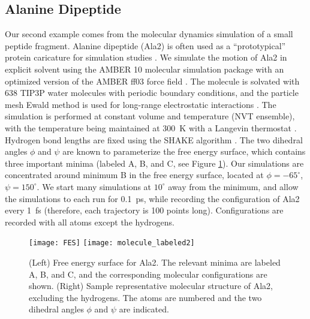 \documentclass[aip,jcp,preprint]{revtex4-1}
\begin{document}
\subsection{Alanine Dipeptide}

Our second example comes from the molecular dynamics simulation of a small peptide fragment.
%
Alanine dipeptide (Ala2) is often used as a ``prototypical'' protein caricature for simulation studies
\cite{apostolakis1999calculation, bolhuis2000reaction, chekmarev2004long, ma2005automatic, frewen2009exploration, ferguson2011integrating}.
%
We simulate the motion of Ala2 in explicit solvent using the AMBER 10 molecular simulation package \cite{case2008Amber} with an
optimized version \cite{best2009optimized} of the AMBER ff03 force field \cite{duan2003point}.
%
The molecule is solvated with 638 TIP3P water molecules \cite{jorgensen1983comparison}
with periodic boundary conditions, and the particle mesh Ewald method is used for long-range electrostatic interactions \cite{essmann1995smooth}.
%
The simulation is performed at constant volume and temperature (NVT ensemble), with the temperature being maintained at 300~K with a Langevin thermostat \cite{loncharich1992langevin}.
%
Hydrogen bond lengths are fixed using the SHAKE algorithm \cite{ryckaert1977numerical}.
%
The two dihedral angles $\phi$ and $\psi$ are known to parameterize the free energy surface, which contains three important minima (labeled A, B, and C, see Figure \ref{fig:ala_fes}).
%
Our simulations are concentrated around minimum B in the free energy surface, located at $\phi=-65^{\circ}$, $\psi=150^{\circ}$.
%
We start many simulations at $10^{\circ}$ away from the minimum, and allow the simulations to each run for 0.1~ps, while recording the configuration of Ala2 every 1~fs (therefore, each trajectory is 100 points long).
%
Configurations are recorded with all atoms except the hydrogens.

\begin{figure}[ht]
    \texttt{[image: FES]}
    \texttt{[image: molecule\_labeled2]}
    \caption{(Left) Free energy surface for Ala2. The relevant minima are labeled A, B, and C, and the corresponding molecular configurations are shown.
    (Right) Sample representative molecular structure of Ala2, excluding the hydrogens. The atoms are numbered and the two dihedral angles $\phi$ and $\psi$ are indicated.}
    \label{fig:ala_fes}
\end{figure}
\end{document}
